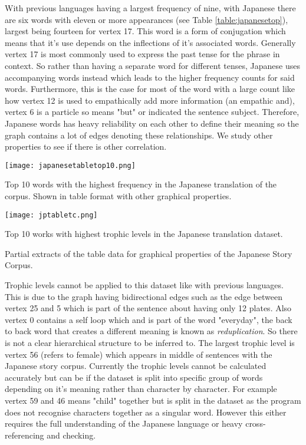 With previous languages having a largest frequency of nine, with Japanese there are six words with eleven or more appearances (see Table \ref{table:japanesetop}), largest being fourteen for vertex 17. This word is a form of conjugation which means that it's use depends on the inflections of it's associated words. Generally vertex 17 is most commonly used to express the past tense for the phrase in context. So rather than having a separate word for different tenses, Japanese uses accompanying words instead which leads to the higher frequency counts for said words. Furthermore, this is the case for most of the word with a large count like how vertex 12 is used to empathically add more information (an empathic and), vertex 6 is a particle so means "but" or indicated the sentence subject. Therefore, Japanese words has heavy reliability on each other to define their meaning so the graph contains a lot of edges denoting these relationships. We study other properties to see if there is other correlation.

\begin{table}[H]
\centering
\begin{subtable}{.45\textwidth}
	\texttt{[image: japanesetabletop10.png]}
	\caption{Top 10 words with the highest frequency in the Japanese translation of the corpus. Shown in table format with other graphical properties. }
	\label{table:japanesetop}
\end{subtable}
\hfill
\begin{subtable}{.45\textwidth}
	\hspace{1.5cm} 
	\texttt{[image: jptabletc.png]}
	\caption{Top 10 works with highest trophic levels in the Japanese translation dataset.}
	\label{table:japanesentoptc}
\end{subtable}
\caption{Partial extracts of the table data for graphical properties of the Japanese Story Corpus.}
\end{table}

Trophic levels cannot be applied to this dataset like with previous languages. This is due to the graph having bidirectional edges such as the edge between vertex 25 and 5 which is part of the sentence about having only 12 plates. Also vertex 0 contains a self loop which and is part of the word "everyday", the back to back word that creates a different meaning is known as \emph{reduplication}. So there is not a clear hierarchical structure to be inferred to. The largest trophic level is vertex 56 (refers to female) which appears in middle of sentences with the Japanese story corpus. Currently the trophic levels cannot be calculated accurately but can be if the dataset is split into specific group of words depending on it's meaning rather than character by character. For example vertex 59 and 46 means "child" together but is split in the dataset as the program does not recognise characters together as a singular word. However this either requires the full understanding of the Japanese language or heavy cross-referencing and checking. 

